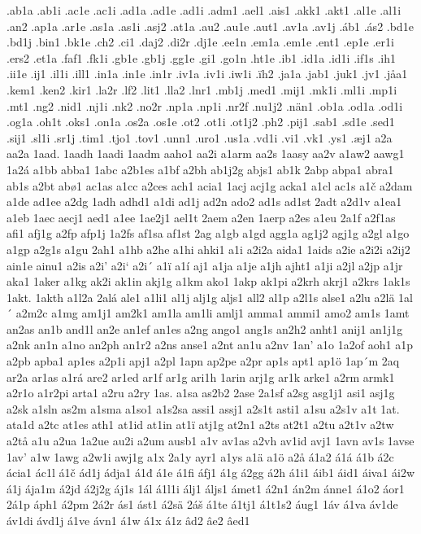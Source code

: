 .ab1a
.ab1i
.ac1e
.ac1i
.ad1a
.ad1e
.ad1i
.adm1
.ael1
.ais1
.akk1
.akt1
.al1e
.al1i
.an2
.ap1a
.ar1e
.as1a
.as1i
.asj2
.at1a
.au2
.au1e
.aut1
.av1a
.av1j
.áb1
.ás2
.bd1e
.bd1j
.bin1
.bk1e
.ch2
.ci1
.daj2
.di2r
.dj1e
.ee1n
.em1a
.em1e
.ent1
.ep1e
.er1i
.ers2
.et1a
.faf1
.fk1i
.gb1e
.gb1j
.gg1e
.gi1
.go1n
.ht1e
.ib1
.id1a
.id1i
.if1s
.ih1
.ii1e
.ij1
.il1i
.ill1
.in1a
.in1e
.in1r
.iv1a
.iv1i
.iw1i
.ïh2
.ja1a
.jab1
.juk1
.jv1
.jåa1
.kem1
.ken2
.kir1
.la2r
.lf2
.lit1
.lla2
.lnr1
.mb1j
.med1
.mij1
.mk1i
.ml1i
.mp1i
.mt1
.ng2
.nid1
.nj1i
.nk2
.no2r
.np1a
.np1i
.nr2f
.nu1j2
.nän1
.ob1a
.od1a
.od1i
.og1a
.oh1t
.oks1
.on1a
.os2a
.os1e
.ot2
.ot1i
.ot1j2
.ph2
.pij1
.sab1
.sd1e
.sed1
.sij1
.sl1i
.sr1j
.tim1
.tjo1
.tov1
.unn1
.uro1
.us1a
.vd1i
.vi1
.vk1
.ys1
.æj1
a2a
aa2a
1aad.
1aadh
1aadi
1aadm
aaho1
aa2i
a1arm
aa2s
1aasy
aa2v
a1aw2
aawg1
1a2á
a1bb
abba1
1abc
a2b1es
a1bf
a2bh
ab1j2g
abjs1
ab1k
2abp
abpa1
abra1
ab1s
a2bt
abø1
ac1as
a1cc
a2ces
ach1
acia1
1acj
acj1g
acka1
a1cl
ac1s
a1č
a2dam
a1de
ad1ee
a2dg
1adh
adhd1
a1di
ad1j
ad2n
ado2
ad1s
ad1st
2adt
a2d1v
a1ea1
a1eb
1aec
aecj1
aed1
a1ee
1ae2j1
ael1t
2aem
a2en
1aerp
a2es
a1eu
2a1f
a2f1as
afi1
afj1g
a2fp
afp1j
1a2fs
af1sa
af1st
2ag
a1gb
a1gd
agg1a
ag1j2
agj1g
a2gl
a1go
a1gp
a2g1s
a1gu
2ah1
a1hb
a2he
a1hi
ahki1
a1i
a2i2a
aida1
1aids
a2ie
a2i2i
a2ij2
ain1e
ainu1
a2is
a2i'
a2i`
a2i´
a1ï
a1í
aj1
a1ja
a1je
a1jh
ajht1
a1ji
a2jl
a2jp
a1jr
aka1
1aker
a1kg
ak2i
ak1in
akj1g
a1km
ako1
1akp
ak1pi
a2krh
akrj1
a2krs
1ak1s
1akt.
1akth
a1l2a
2alá
ale1
a1li1
al1j
alj1g
aljs1
all2
al1p
a2l1s
alse1
a2lu
a2lä
1al´
a2m2c
a1mg
am1j1
am2k1
am1la
am1li
amlj1
amma1
ammi1
amo2
am1s
1amt
an2as
an1b
and1l
an2e
an1ef
an1es
a2ng
ango1
ang1s
an2h2
anht1
anij1
an1j1g
a2nk
an1n
a1no
an2ph
an1r2
a2ns
anse1
a2nt
an1u
a2nv
1an'
a1o
1a2of
aoh1
a1p
a2pb
apba1
ap1es
a2p1i
apj1
a2pl
1apn
ap2pe
a2pr
ap1s
apt1
ap1ö
1ap´m
2aq
ar2a
ar1as
a1rá
are2
ar1ed
ar1f
ar1g
ari1h
1arin
arj1g
ar1k
arke1
a2rm
armk1
a2r1o
a1r2pi
arta1
a2ru
a2ry
1as.
a1sa
as2b2
2ase
2a1sf
a2sg
asg1j1
asi1
asj1g
a2sk
a1sln
as2m
a1sma
a1so1
a1s2sa
assi1
assj1
a2s1t
asti1
a1su
a2s1v
a1t
1at.
ata1d
a2tc
at1es
ath1
at1id
at1in
at1ï
atj1g
at2n1
a2ts
at2t1
a2tu
a2t1v
a2tw
a2tå
a1u
a2ua
1a2ue
au2i
a2um
ausb1
a1v
av1as
a2vh
av1id
avj1
1avn
av1s
1avse
1av'
a1w
1awg
a2w1i
awj1g
a1x
2a1y
ayr1
a1ys
a1ä
a1ö
a2å
á1a2
á1á
á1b
á2c
ácia1
ác1l
á1č
ád1j
ádja1
á1đ
á1e
á1fi
áfj1
á1g
á2gg
á2h
á1i1
áib1
áid1
áiva1
ái2w
á1j
ája1m
á2jd
á2j2g
áj1s
1ál
á1l1i
álj1
áljs1
ámet1
á2n1
án2m
ánne1
á1o2
áor1
2á1p
áph1
á2pm
2á2r
ás1
ást1
á2sä
2áš
á1te
á1tj1
á1t1s2
áug1
1áv
á1va
áv1de
áv1di
ávd1j
á1ve
ávn1
á1w
á1x
á1z
âd2
âe2
âed1
